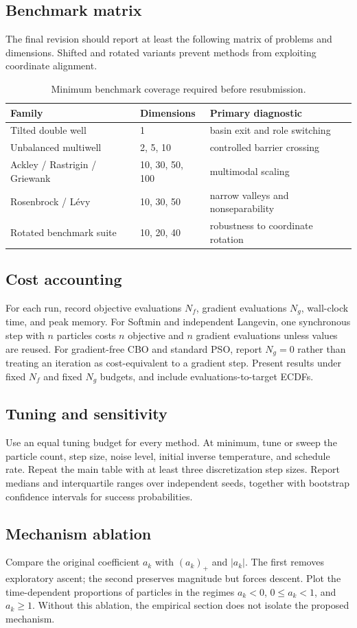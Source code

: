 \documentclass{article}
\theoremstyle{plain}
\theoremstyle{definition}
\theoremstyle{remark}
\begin{document}
\subsection{Benchmark matrix}
The final revision should report at least the following matrix of problems and dimensions.  Shifted and rotated variants prevent methods from exploiting coordinate alignment.
\begin{table}[H]
\centering
\begin{tabular}{lll}
\toprule
Family & Dimensions & Primary diagnostic \\
\midrule
Tilted double well & 1 & basin exit and role switching \\
Unbalanced multiwell & 2, 5, 10 & controlled barrier crossing \\
Ackley / Rastrigin / Griewank & 10, 30, 50, 100 & multimodal scaling \\
Rosenbrock / L\'evy & 10, 30, 50 & narrow valleys and nonseparability \\
Rotated benchmark suite & 10, 20, 40 & robustness to coordinate rotation \\
\bottomrule
\end{tabular}
\caption{Minimum benchmark coverage required before resubmission.}
\end{table}

\subsection{Cost accounting}
For each run, record objective evaluations \(N_f\), gradient evaluations \(N_g\), wall-clock time, and peak memory.  For Softmin and independent Langevin, one synchronous step with \(n\) particles costs \(n\) objective and \(n\) gradient evaluations unless values are reused.  For gradient-free CBO and standard PSO, report \(N_g=0\) rather than treating an iteration as cost-equivalent to a gradient step.  Present results under fixed \(N_f\) and fixed \(N_g\) budgets, and include evaluations-to-target ECDFs.

\subsection{Tuning and sensitivity}
Use an equal tuning budget for every method.  At minimum, tune or sweep the particle count, step size, noise level, initial inverse temperature, and schedule rate.  Repeat the main table with at least three discretization step sizes.  Report medians and interquartile ranges over independent seeds, together with bootstrap confidence intervals for success probabilities.

\subsection{Mechanism ablation}
Compare the original coefficient \(a_k\) with \((a_k)_+\) and \(|a_k|\).  The first removes exploratory ascent; the second preserves magnitude but forces descent.  Plot the time-dependent proportions of particles in the regimes \(a_k<0\), \(0\le a_k<1\), and \(a_k\ge1\).  Without this ablation, the empirical section does not isolate the proposed mechanism.
\end{document}
